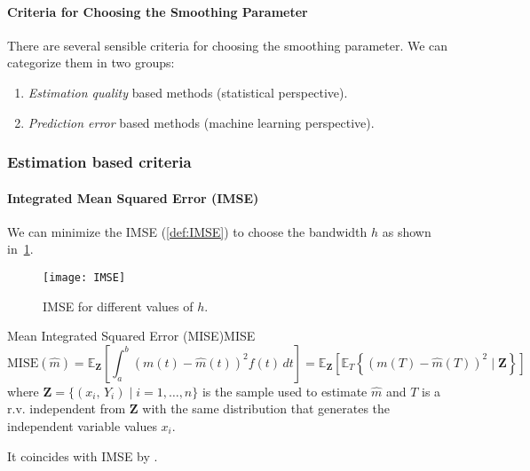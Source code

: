 \paragraph{Criteria for Choosing the Smoothing Parameter}
There are several sensible criteria for choosing the smoothing parameter. We can
categorize them in two groups:
\begin{enumerate}
    \item \emph{Estimation quality} based methods (statistical perspective).
    \item \emph{Prediction error} based methods (machine learning perspective).
\end{enumerate}

\subsubsection{Estimation based criteria}

\paragraph{Integrated Mean Squared Error (IMSE)} We can minimize the
IMSE (\ref{def:IMSE}) to choose the bandwidth $h$ as shown in~\cref{fig:IMSE}.
\begin{figure}[H]
    \texttt{[image: IMSE]}
    \caption{IMSE for different values of $h$.}%
    \label{fig:IMSE}
\end{figure}

\begin{definition}{Mean Integrated Squared Error (MISE)}{MISE}
    \begin{equation*}
        \text{MISE}(\hat m) = \mathds{E}_{\boldsymbol Z} \left[
            \int_a^b \left( m(t) - \hat m(t) \right)^2 f(t) \, dt
        \right] =
        \mathds{E}_{\boldsymbol Z} \left[
            \mathds{E}_T \left\{
                \left( m(T) - \hat m(T) \right)^2 \mid \boldsymbol Z
            \right\}
        \right]
    \end{equation*}
    where $\boldsymbol Z = \{(x_i,\, Y_i) \mid i = 1,\ldots,n\}$ is the sample
    used to estimate $\hat m$ and $T$ is a r.v. independent from $\boldsymbol Z$
    with the same distribution that generates the independent variable values $x_i$.
    \tcblower
    \begin{note}
        It coincides with IMSE by .
    \end{note}
\end{definition}

